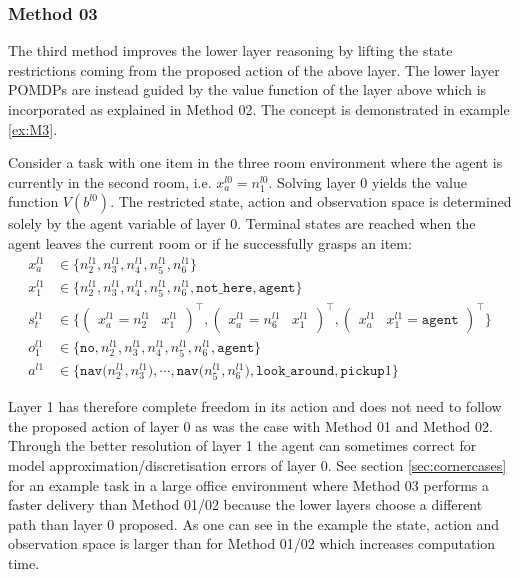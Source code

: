 \subsubsection{Method 03}\label{subsec:M3}
The third method improves the lower layer reasoning by lifting the state restrictions coming from the proposed action of the above layer. The lower layer POMDPs are instead guided by the value function of the layer above which is incorporated as explained in Method 02. The concept is demonstrated in example \ref{ex:M3}.

\begin{example}\label{ex:M3}
Consider a task with one item in the three room environment where the agent is currently in the second room, i.e. $x_a^{l0}=n_1^{l0}$. Solving layer 0 yields the value function $V(b^{l0})$. The restricted state, action and observation space is determined solely by the agent variable of layer 0. Terminal states are reached when the agent leaves the current room or if he successfully grasps an item:
\begin{equation}
    \begin{aligned}
        x_a^{l1} &\in \big\{ n_2^{l1}, n_3^{l1}, n_4^{l1}, n_5^{l1}, n_6^{l1} \big\} \\
        x_1^{l1} &\in  \big\{ n_2^{l1}, n_3^{l1}, n_4^{l1}, n_5^{l1}, n_6^{l1}, \texttt{not\_here}, \texttt{agent} \big\}\\
         s_t^{l1} &\in \big\{\begin{pmatrix} x_a^{l1}=n_2^{l1} & x_1^{l1} \end{pmatrix}^\intercal, \begin{pmatrix} x_a^{l1}=n_6^{l1} & x_1^{l1} \end{pmatrix}^\intercal,  \begin{pmatrix} x_a^{l1} & x_1^{l1}=\texttt{agent} \end{pmatrix}^\intercal \big\}\\
        o_1^{l1} &\in \big\{\texttt{no}, n_2^{l1}, n_3^{l1}, n_4^{l1}, n_5^{l1}, n_6^{l1}, \texttt{agent} \big\}\\
        a^{l1} &\in \big\{\texttt{nav($n_2^{l1}, n_3^{l1}$)}, \cdots,  \texttt{nav($n_5^{l1}, n_6^{l1}$)}, \texttt{look\_around}, \texttt{pickup}1 \big\}
    \end{aligned}
\end{equation}
\demo
\end{example}
Layer 1 has therefore complete freedom in its action and does not need to follow the proposed action of layer 0 as was the case with Method 01 and Method 02. Through the better resolution of layer 1 the agent can sometimes correct for model approximation/discretisation errors of layer 0. See section \ref{sec:cornercases} for an example task in a large office environment where Method 03 performs a faster delivery than Method 01/02 because the lower layers choose a different path than layer 0 proposed. As one can see in the example the state, action and observation space is larger than for Method 01/02 which increases computation time.\\


